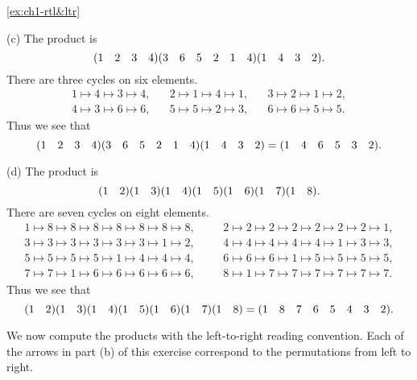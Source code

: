 \begin{solution}{\ref{ex:ch1-rtl&ltr}}
{    (c) The product is
    \[
    (1 \quad 2 \quad 3 \quad 4)(3 \quad 6 \quad 5 \quad 2 \quad 1 \quad 4)(1 \quad 4 \quad 3 \quad 2).
    \]
    There are three cycles on six elements.
    \[
    \begin{array}{c}
        1 \mapsto 4 \mapsto 3 \mapsto 4, \hspace{20pt} 2 \mapsto 1 \mapsto 4 \mapsto 1, \hspace{20pt} 3 \mapsto 2 \mapsto 1 \mapsto 2,\\
        4 \mapsto 3 \mapsto 6 \mapsto 6, \hspace{20pt} 5 \mapsto 5 \mapsto 2 \mapsto 3, \hspace{20pt} 6 \mapsto 6 \mapsto 5 \mapsto 5.
    \end{array}
    \]
    Thus we see that
    \[
    (1 \quad 2 \quad 3 \quad 4)(3 \quad 6 \quad 5 \quad 2 \quad 1 \quad 4)(1 \quad 4 \quad 3 \quad 2) = (1 \quad 4 \quad 6 \quad 5 \quad 3 \quad 2).
    \]

    (d) The product is
    \[
    (1 \quad 2)(1 \quad 3)(1 \quad 4)(1 \quad 5)(1 \quad 6)(1 \quad 7)(1 \quad 8).
    \]
    There are seven cycles on eight elements.
    \[
    \begin{array}{cc}
        1 \mapsto 8 \mapsto 8 \mapsto 8 \mapsto 8 \mapsto 8 \mapsto 8 \mapsto 8,&\hspace{20pt}
        2 \mapsto 2 \mapsto 2 \mapsto 2 \mapsto 2 \mapsto 2 \mapsto 2 \mapsto 1,\\
        3 \mapsto 3 \mapsto 3 \mapsto 3 \mapsto 3 \mapsto 3 \mapsto 1 \mapsto 2,&\hspace{20pt}
        4 \mapsto 4 \mapsto 4 \mapsto 4 \mapsto 4 \mapsto 1 \mapsto 3 \mapsto 3,\\
        5 \mapsto 5 \mapsto 5 \mapsto 5 \mapsto 1 \mapsto 4 \mapsto 4 \mapsto 4,&\hspace{20pt}
        6 \mapsto 6 \mapsto 6 \mapsto 1 \mapsto 5 \mapsto 5 \mapsto 5 \mapsto 5,\\
        7 \mapsto 7 \mapsto 1 \mapsto 6 \mapsto 6 \mapsto 6 \mapsto 6 \mapsto 6,&\hspace{20pt}
        8 \mapsto 1 \mapsto 7 \mapsto 7 \mapsto 7 \mapsto 7 \mapsto 7 \mapsto 7.
    \end{array}
    \]
    Thus we see that
    \[
    (1 \quad 2)(1 \quad 3)(1 \quad 4)(1 \quad 5)(1 \quad 6)(1 \quad 7)(1 \quad 8) = (1 \quad 8 \quad 7 \quad 6 \quad 5 \quad 4 \quad 3 \quad 2).
    \]

    We now compute the products with the left-to-right reading convention. Each of the arrows in part (b) of this exercise correspond to the permutations from left to right.

}
\end{solution}
